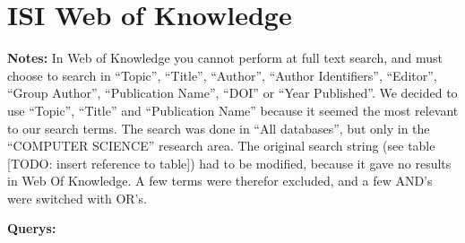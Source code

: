 \section{ISI Web of Knowledge}
\par \textbf{Notes:} In Web of Knowledge you cannot perform at full text search, and must choose to search in ``Topic'', ``Title'', ``Author'', ``Author Identifiers'', ``Editor'', ``Group Author'', ``Publication Name'', ``DOI'' or ``Year Published''. We decided to use ``Topic'', ``Title'' and ``Publication Name'' because it seemed the most relevant to our search terms. The search was done in ``All databases'', but only in the ``COMPUTER SCIENCE'' research area. The original search string (see table [TODO: insert reference to table]) had to be modified, because it gave no results in Web Of Knowledge. A few terms were therefor excluded, and a few AND's were switched with OR's. 
\par \textbf{Querys:}
